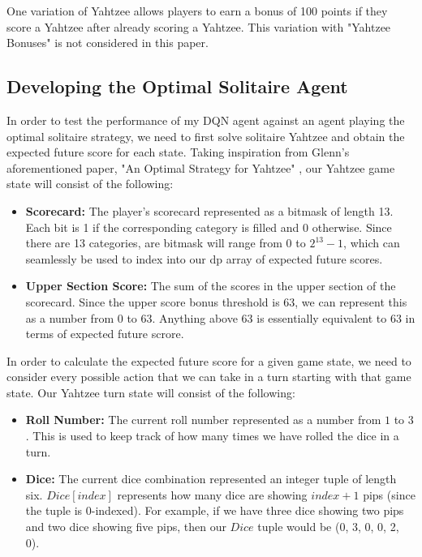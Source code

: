 \documentclass[12pt]{article}
\begin{document}
\noindent
One variation of Yahtzee allows players to earn a bonus of 100 points if they score a Yahtzee after already scoring a Yahtzee. This variation with "Yahtzee Bonuses" is not considered in this paper. 

\subsection{Developing the Optimal Solitaire Agent}
In order to test the performance of my DQN agent against an agent playing the optimal solitaire strategy, we need to first solve solitaire Yahtzee and obtain the expected future score for each state. Taking inspiration from Glenn's aforementioned paper, "An Optimal Strategy for Yahtzee" \cite{glenn}, our Yahtzee game state will consist of the following:

\begin{itemize}
    \item \textbf{Scorecard:} The player's scorecard represented as a bitmask of length 13. Each bit is 1 if the corresponding category is filled and 0 otherwise. Since there are 13 categories, are bitmask will range from $0$ to $2^{13} - 1$, which can seamlessly be used to index into our dp array of expected future scores.
    \item \textbf{Upper Section Score:} The sum of the scores in the upper section of the scorecard. Since the upper score bonus threshold is 63, we can represent this as a number from $0$ to $63$. Anything above 63 is essentially equivalent to 63 in terms of expected future scrore.
\end{itemize}

\noindent
In order to calculate the expected future score for a given game state, we need to consider every possible action that we can take in a turn starting with that game state. Our Yahtzee turn state will consist of the following:

\begin{itemize}
    \item \textbf{Roll Number:} The current roll number represented as a number from $1$ to $3$. This is used to keep track of how many times we have rolled the dice in a turn.
    \item \textbf{Dice:} The current dice combination represented an integer tuple of length six. $Dice[index]$ represents how many dice are showing $index + 1$ pips (since the tuple is 0-indexed). For example, if we have three dice showing two pips and two dice showing five pips, then our $Dice$ tuple would be (0, 3, 0, 0, 2, 0).
\end{itemize}
\end{document}
